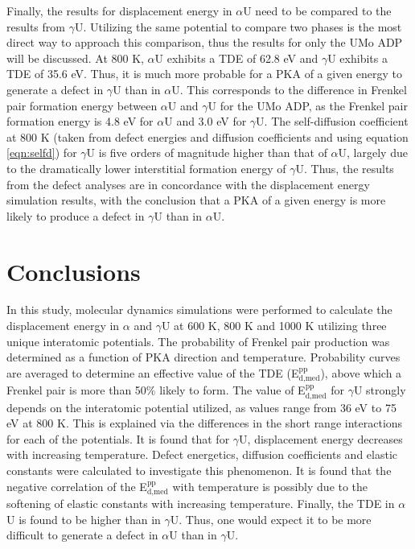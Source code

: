 \documentclass[review]{elsarticle}
\begin{document}
Finally, the results for displacement energy in $\alpha$U need to be compared to the results from $\gamma$U. Utilizing the same potential to compare two phases is the most direct way to approach this comparison, thus the results for only the UMo ADP will be discussed. At 800 K, $\alpha$U exhibits a TDE of 62.8 eV and $\gamma$U exhibits a TDE of 35.6 eV. Thus, it is much more probable for a PKA of a given energy to generate a defect in $\gamma$U than in $\alpha$U. This corresponds to the difference in Frenkel pair formation energy between $\alpha$U and $\gamma$U for the UMo ADP, as the Frenkel pair formation energy is 4.8 eV for $\alpha$U and 3.0 eV for $\gamma$U. The self-diffusion coefficient at 800 K (taken from defect energies and diffusion coefficients and using equation \ref{eqn:selfd}) for $\gamma$U is five orders of magnitude higher than that of $\alpha$U, largely due to the dramatically lower interstitial formation energy of $\gamma$U. Thus, the results from the defect analyses are in concordance with the displacement energy simulation results, with the conclusion that a PKA of a given energy is more likely to produce a defect in $\gamma$U than in $\alpha$U. 

\FloatBarrier

\section{Conclusions}

In this study, molecular dynamics simulations were performed to calculate the displacement energy in $\alpha$ and $\gamma$U at 600 K, 800 K and 1000 K utilizing three unique interatomic potentials. The probability of Frenkel pair production was determined as a function of PKA direction and temperature. Probability curves are averaged to determine an effective value of the TDE (E$^{\textrm{pp}}_{\textrm{d,med}}$), above which a Frenkel pair is more than 50$\%$ likely to form. The value of E$^{\textrm{pp}}_{\textrm{d,med}}$ for $\gamma$U strongly depends on the interatomic potential utilized, as values range from 36 eV to 75 eV at 800 K. This is explained via the differences in the short range interactions for each of the potentials. It is found that for $\gamma$U, displacement energy decreases with increasing temperature. Defect energetics, diffusion coefficients and elastic constants were calculated to investigate this phenomenon. It is found that the negative correlation of the E$^{\textrm{pp}}_{\textrm{d,med}}$ with temperature is possibly due to the softening of elastic constants with increasing temperature. Finally, the TDE in $\alpha$U is found to be higher than in $\gamma$U. Thus, one would expect it to be more difficult to generate a defect in $\alpha$U than in $\gamma$U.
\end{document}
